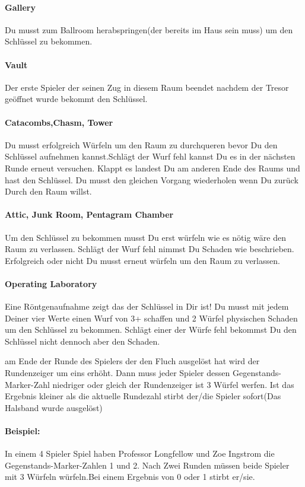 \paragraph{Gallery} Du musst zum Ballroom herabspringen(der bereits im Haus sein muss) um den Schlüssel zu bekommen.
\paragraph{Vault} Der erste Spieler der seinen Zug in diesem Raum beendet nachdem der Tresor geöffnet wurde bekommt den Schlüssel.
\paragraph{Catacombs,Chasm, Tower} Du musst erfolgreich Würfeln um den Raum zu durchqueren bevor Du den Schlüssel aufnehmen kannst.Schlägt der Wurf fehl kannst Du es in der nächsten Runde erneut versuchen. Klappt es landest Du am anderen Ende des Raums und hast den Schlüssel. Du musst den gleichen Vorgang wiederholen wenn Du zurück Durch den Raum willst.
\paragraph{Attic, Junk Room, Pentagram Chamber} Um den Schlüssel zu bekommen musst Du erst würfeln wie es nötig wäre den Raum zu verlassen. Schlägt der Wurf fehl nimmst Du Schaden wie beschrieben. Erfolgreich oder nicht Du musst erneut würfeln um den Raum zu verlassen.
\paragraph{Operating Laboratory} Eine Röntgenaufnahme zeigt das der Schlüssel in Dir ist! Du musst mit jedem Deiner vier Werte einen Wurf von 3+ schaffen und 2 Würfel physischen Schaden um den Schlüssel zu bekommen. Schlägt einer der Würfe fehl bekommst Du den Schlüssel nicht dennoch aber den Schaden.

\newpage


am Ende der Runde des Spielers der den Fluch ausgelöst hat wird der Rundenzeiger um eins erhöht.
Dann muss jeder Spieler dessen Gegenstands-Marker-Zahl niedriger oder gleich der Rundenzeiger ist 3 Würfel werfen. Ist das Ergebnis kleiner als die aktuelle Rundezahl stirbt der/die Spieler sofort(Das Halsband wurde ausgelöst)

\paragraph{Beispiel:} In einem 4 Spieler Spiel haben Professor Longfellow und Zoe Ingstrom die Gegenstands-Marker-Zahlen 1 und 2. Nach Zwei Runden müssen beide Spieler mit 3 Würfeln würfeln.Bei einem Ergebnis von 0 oder 1 stirbt er/sie.

